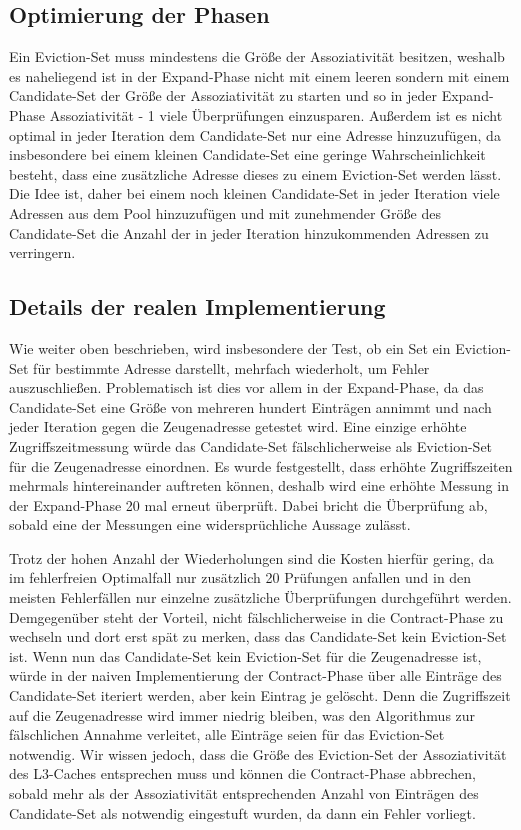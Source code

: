 \subsection{Optimierung der Phasen}

Ein Eviction-Set muss mindestens die Größe der Assoziativität besitzen, weshalb es naheliegend ist in der Expand-Phase nicht mit einem leeren sondern mit einem Candidate-Set der Größe der Assoziativität zu starten und so in jeder Expand-Phase Assoziativität - 1 viele Überprüfungen einzusparen.
Außerdem ist es nicht optimal in jeder Iteration dem Candidate-Set nur eine Adresse hinzuzufügen, da insbesondere bei einem kleinen Candidate-Set eine geringe Wahrscheinlichkeit besteht, dass eine zusätzliche Adresse dieses zu einem Eviction-Set werden lässt.
Die Idee ist, daher bei einem noch kleinen Candidate-Set in jeder Iteration viele Adressen aus dem Pool hinzuzufügen und mit zunehmender Größe des Candidate-Set die Anzahl der in jeder Iteration hinzukommenden Adressen zu verringern.

\subsection{Details der realen Implementierung}

Wie weiter oben beschrieben, wird insbesondere der Test, ob ein Set ein Eviction-Set für bestimmte
Adresse darstellt, mehrfach wiederholt, um Fehler auszuschließen. Problematisch ist dies vor allem in der Expand-Phase, da das Candidate-Set eine Größe von mehreren hundert Einträgen annimmt und nach jeder Iteration gegen die Zeugenadresse getestet wird. 
Eine einzige erhöhte Zugriffszeitmessung würde das Candidate-Set fälschlicherweise als Eviction-Set für die Zeugenadresse einordnen. 
Es wurde festgestellt, dass erhöhte Zugriffszeiten mehrmals hintereinander auftreten können, deshalb wird eine erhöhte Messung in der Expand-Phase 20 mal erneut überprüft. 
Dabei bricht die Überprüfung ab, sobald eine der Messungen eine widersprüchliche Aussage zulässt.

Trotz der hohen Anzahl der Wiederholungen sind die Kosten hierfür gering, da im fehlerfreien Optimalfall nur zusätzlich 20 Prüfungen anfallen und in den meisten Fehlerfällen nur einzelne zusätzliche Überprüfungen durchgeführt werden. 
Demgegenüber steht der Vorteil, nicht fälschlicherweise in die Contract-Phase zu wechseln und dort erst spät zu merken, dass das Candidate-Set kein Eviction-Set ist.
Wenn nun das Candidate-Set kein Eviction-Set für die Zeugenadresse ist, würde in der naiven Implementierung der Contract-Phase über alle Einträge des Candidate-Set iteriert werden, aber kein Eintrag je gelöscht.
Denn die Zugriffszeit auf die Zeugenadresse wird immer niedrig bleiben, was den Algorithmus zur fälschlichen Annahme verleitet, alle Einträge seien für das Eviction-Set notwendig.
Wir wissen jedoch, dass die Größe des Eviction-Set der Assoziativität des L3-Caches entsprechen muss und können die Contract-Phase abbrechen, sobald mehr als der Assoziativität entsprechenden Anzahl von Einträgen des Candidate-Set als notwendig eingestuft wurden, da dann ein Fehler vorliegt.

